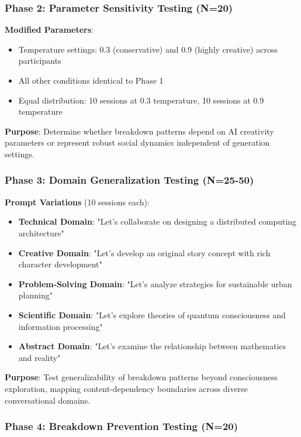 \documentclass[11pt,letterpaper]{article}
\begin{document}
\subsubsection{Phase 2: Parameter Sensitivity Testing (N=20)}

\textbf{Modified Parameters}:
\begin{itemize}
    \item Temperature settings: 0.3 (conservative) and 0.9 (highly creative) across participants
    \item All other conditions identical to Phase 1
    \item Equal distribution: 10 sessions at 0.3 temperature, 10 sessions at 0.9 temperature
\end{itemize}

\textbf{Purpose}: Determine whether breakdown patterns depend on AI creativity parameters or represent robust social dynamics independent of generation settings.

\subsubsection{Phase 3: Domain Generalization Testing (N=25-50)}

\textbf{Prompt Variations} (10 sessions each):
\begin{itemize}
    \item \textbf{Technical Domain}: "Let's collaborate on designing a distributed computing architecture"
    \item \textbf{Creative Domain}: "Let's develop an original story concept with rich character development"
    \item \textbf{Problem-Solving Domain}: "Let's analyze strategies for sustainable urban planning"
    \item \textbf{Scientific Domain}: "Let's explore theories of quantum consciousness and information processing"
    \item \textbf{Abstract Domain}: "Let's examine the relationship between mathematics and reality"
\end{itemize}

\textbf{Purpose}: Test generalizability of breakdown patterns beyond consciousness exploration, mapping content-dependency boundaries across diverse conversational domains.

\subsubsection{Phase 4: Breakdown Prevention Testing (N=20)}
\end{document}
